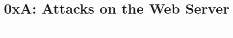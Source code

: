 \documentclass[aspectratio=169]{beamer}
\begin{document}
\section{0xA: Attacks on the Web Server}
{
\begin{frame}
\huge{\textcolor{white}{\textbf{0xB: Attacks on the Web Server}}}
\end{frame}
}
\end{document}
